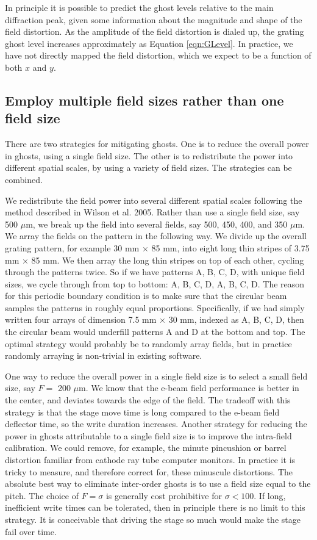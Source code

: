 \documentclass[]{spie}  %
\begin{document}
In principle it is possible to predict the ghost levels relative to the main diffraction peak, given some information about the magnitude and shape of the field distortion.  As the amplitude of the field distortion is dialed up, the grating ghost level increases approximately as Equation \ref{eqn:GLevel}.  In practice, we have not directly mapped the field distortion, which we expect to be a function of both $x $ and $y$.

\subsection{Employ multiple field sizes rather than one field size}
\label{sec:MultipleFields}
There are two strategies for mitigating ghosts.  One is to reduce the overall power in ghosts, using a single field size.  The other is to redistribute the power into different spatial scales, by using a variety of field sizes.  The strategies can be combined.

We redistribute the field power into several different spatial scales following the method described in Wilson et al. 2005\cite{2005SPIE.5720...68W}.  Rather than use a single field size, say 500 $\mu$m, we break up the field into several fields, say 500, 450, 400, and 350 $\mu$m.  We array the fields on the pattern in the following way.  We divide up the overall grating pattern, for example 30 mm $\times$ 85 mm, into eight long thin stripes of 3.75 mm $\times$ 85 mm.  We then array the long thin stripes on top of each other, cycling through the patterns twice.  So if we have patterns A, B, C, D, with unique field sizes, we cycle through from top to bottom: A, B, C, D, A, B, C, D.  The reason for this periodic boundary condition is to make sure that the circular beam samples the patterns in roughly equal proportions.  Specifically, if we had simply written four arrays of dimension 7.5 mm $\times$ 30 mm, indexed as A, B, C, D, then the circular beam would underfill patterns A and D at the bottom and top.  The optimal strategy would probably be to randomly array fields, but in practice randomly arraying is non-trivial in existing software.

One way to reduce the overall power in a single field size is to select a small field size, say $F=$ 200 $\mu$m.   We know that the e-beam field performance is better in the center, and deviates towards the edge of the field.  The tradeoff with this strategy is that the stage move time is long compared to the e-beam field deflector time, so the write duration increases.  Another strategy for reducing the power in ghosts attributable to a single field size is to improve the intra-field calibration.   We could remove, for example, the minute pincushion or barrel distortion familiar from cathode ray tube computer monitors.  In practice it is tricky to measure, and therefore correct for, these minuscule distortions.  The absolute best way to eliminate inter-order ghosts is to use a field size equal to the pitch.  The choice of $F= \sigma$ is generally cost prohibitive for $\sigma <100$.  If long, inefficient write times can be tolerated, then in principle there is no limit to this strategy.  It is conceivable that driving the stage so much would make the stage fail over time.
\end{document}
